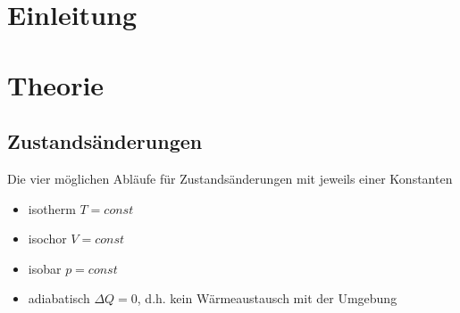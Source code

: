 \documentclass[12pt, a4paper, twoside]{scrartcl}
\begin{document}

\cleardoublepage
\tableofcontents
\cleardoublepage
\setcounter{page}{1}

\section{Einleitung}
\label{sec:einleitung}

\section{Theorie}
\label{sec:theorie}
\subsection*{Zustandsänderungen}
 Die vier möglichen Abläufe für Zustandsänderungen mit jeweils einer Konstanten
\begin{itemize}
\item isotherm $T=const$
\item isochor $V=const$
\item isobar $p=const$
\item adiabatisch $\Delta Q=0$, d.h. kein Wärmeaustausch mit der Umgebung
\end{itemize}
\end{document}
